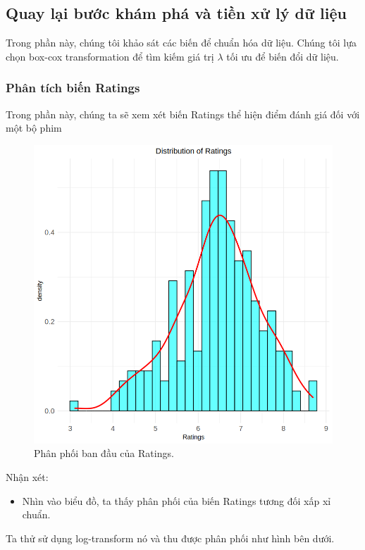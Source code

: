 \subsection{Quay lại bước khám phá và tiền xử lý dữ liệu}

Trong phần này, chúng tôi khảo sát các biến để chuẩn hóa dữ liệu. Chúng tôi lựa chọn box-cox transformation để tìm kiếm giá trị $\lambda$ tối ưu để biến đổi dữ liệu.

\subsubsection{Phân tích biến Ratings}

Trong phần này, chúng ta sẽ xem xét biến Ratings thể hiện điểm đánh giá đối với một bộ phim

\begin{figure}[H]
    \centering
    \includegraphics[width=0.75\columnwidth]{csm_figures/ratings_original_distribution.png}
    \caption{Phân phối ban đầu của Ratings.}
    \label{fig:ratings_original_distribution}
\end{figure}

Nhận xét:
\begin{itemize}
    \item Nhìn vào biểu đồ, ta thấy phân phối của biến Ratings tương đối xấp xỉ chuẩn.
\end{itemize}

Ta thử sử dụng log-transform nó và thu được phân phối như hình bên dưới.

